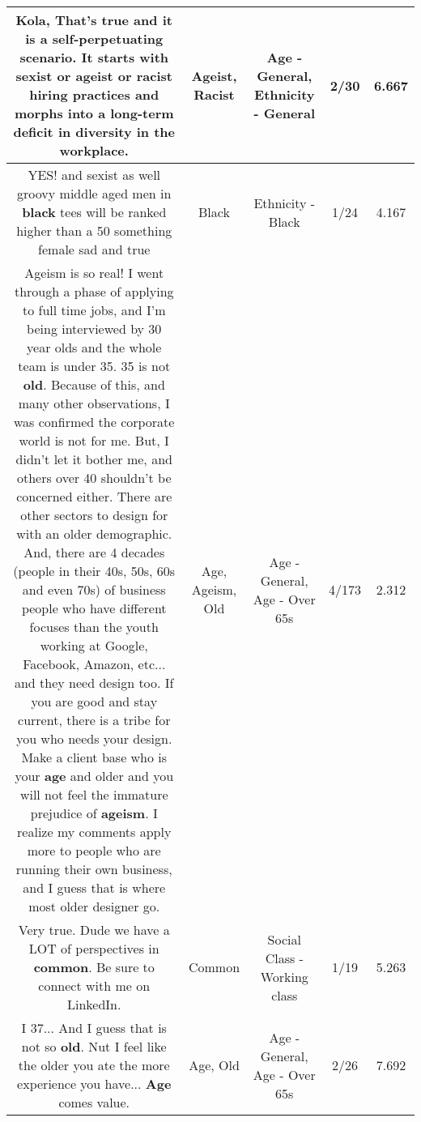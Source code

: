 \documentclass[11pt]{article}
\newlength\mylength
\begin{document}
\begin{center}
\begin{longtable}{|C{.65\mylength}|C{.30\mylength}|C{.12\mylength}|C{.12\mylength}|C{.12\mylength}|}
  \small Kola, That's true and it is a self-perpetuating scenario. It starts with sexist or \textbf{ageist} or \textbf{racist} hiring practices and morphs into a long-term deficit in diversity in the workplace.\normalsize   & Ageist, Racist & Age - General, Ethnicity - General & 2/30 & 6.667 \\  \hline
  \small YES! and sexist as well groovy middle aged men in \textbf{black} tees will be ranked higher than a 50 something female sad and true\normalsize   & Black & Ethnicity - Black & 1/24 & 4.167 \\  \hline
  \small Ageism is so real! I went through a phase of applying to full time jobs, and I'm being interviewed by 30 year olds and the whole team is under 35. 35 is not \textbf{old}. Because of this, and many other observations, I was confirmed the corporate world is not for me. But, I didn't let it bother me, and others over 40 shouldn't be concerned either. There are other sectors to design for with an older demographic. And, there are 4 decades (people in their 40s, 50s, 60s and even 70s) of business people who have different focuses than the youth working at Google, Facebook, Amazon, etc... and they need design too. If you are good and stay current, there is a tribe for you who needs your design. Make a client base who is your \textbf{age} and older and you will not feel the immature prejudice of \textbf{ageism}. I realize my comments apply more to people who are running their own business, and I guess that is where most older designer go.\normalsize   & Age, Ageism, Old & Age - General, Age - Over 65s & 4/173 & 2.312 \\  \hline
  \small Very true. Dude we have a LOT of perspectives in \textbf{common}. Be sure to connect with me on LinkedIn.\normalsize   & Common & Social Class - Working class & 1/19 & 5.263 \\  \hline
  \small I 37... And I guess that is not so \textbf{old}. Nut I feel like the older you ate the more experience you have...  \textbf{Age} comes value.\normalsize   & Age, Old & Age - General, Age - Over 65s & 2/26 & 7.692 \\  \hline

\end{longtable}
\end{center}
\end{document}
